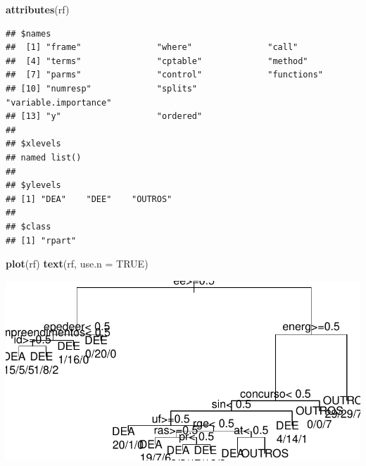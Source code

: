 \documentclass[]{article}
\newenvironment{Shaded}{\begin{snugshade}}{\end{snugshade}}
\newcommand{\KeywordTok}[1]{\textcolor[rgb]{0.13,0.29,0.53}{\textbf{#1}}}
\newcommand{\DataTypeTok}[1]{\textcolor[rgb]{0.13,0.29,0.53}{#1}}
\newcommand{\StringTok}[1]{\textcolor[rgb]{0.31,0.60,0.02}{#1}}
\newcommand{\CommentTok}[1]{\textcolor[rgb]{0.56,0.35,0.01}{\textit{#1}}}
\newcommand{\OtherTok}[1]{\textcolor[rgb]{0.56,0.35,0.01}{#1}}
\newcommand{\OperatorTok}[1]{\textcolor[rgb]{0.81,0.36,0.00}{\textbf{#1}}}
\newcommand{\NormalTok}[1]{#1}
\begin{document}
\begin{Shaded}
\begin{Highlighting}[]
\KeywordTok{attributes}\NormalTok{(rf)}
\end{Highlighting}
\end{Shaded}

\begin{verbatim}
## $names
##  [1] "frame"               "where"               "call"               
##  [4] "terms"               "cptable"             "method"             
##  [7] "parms"               "control"             "functions"          
## [10] "numresp"             "splits"              "variable.importance"
## [13] "y"                   "ordered"            
## 
## $xlevels
## named list()
## 
## $ylevels
## [1] "DEA"    "DEE"    "OUTROS"
## 
## $class
## [1] "rpart"
\end{verbatim}

\begin{Shaded}
\begin{Highlighting}[]
\KeywordTok{plot}\NormalTok{(rf)}
\KeywordTok{text}\NormalTok{(rf, }\DataTypeTok{use.n =} \OtherTok{TRUE}\NormalTok{)}
\end{Highlighting}
\end{Shaded}

\includegraphics{markdown_v42_files/figure-latex/unnamed-chunk-79-1.pdf}

\begin{Shaded}
\end{Shaded}
\end{document}
